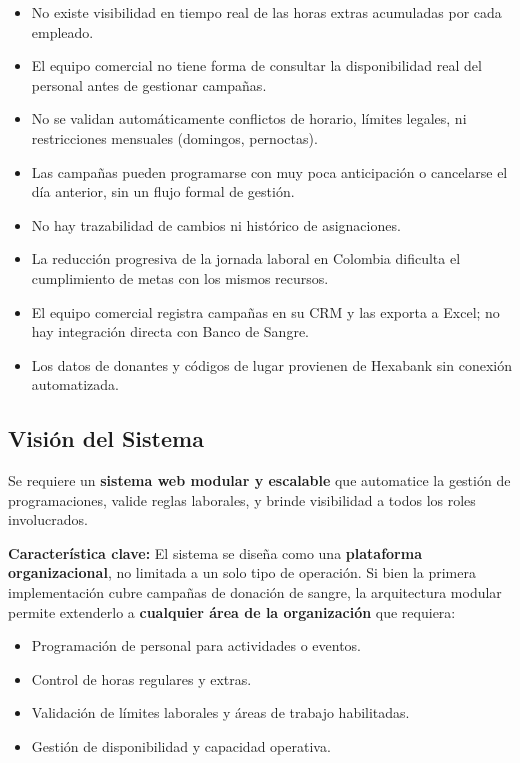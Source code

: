 \documentclass[10pt,a4paper]{article}
\begin{document}
\begin{itemize}[leftmargin=2em]
    \item No existe visibilidad en tiempo real de las horas extras acumuladas por cada empleado.
    \item El equipo comercial no tiene forma de consultar la disponibilidad real del personal antes de gestionar campañas.
    \item No se validan autom\'{a}ticamente conflictos de horario, l\'{i}mites legales, ni restricciones mensuales (domingos, pernoctas).
    \item Las campañas pueden programarse con muy poca anticipaci\'{o}n o cancelarse el d\'{i}a anterior, sin un flujo formal de gesti\'{o}n.
    \item No hay trazabilidad de cambios ni hist\'{o}rico de asignaciones.
    \item La reducci\'{o}n progresiva de la jornada laboral en Colombia dificulta el cumplimiento de metas con los mismos recursos.
    \item El equipo comercial registra campañas en su CRM y las exporta a Excel; no hay integraci\'{o}n directa con Banco de Sangre.
    \item Los datos de donantes y c\'{o}digos de lugar provienen de Hexabank sin conexi\'{o}n automatizada.
\end{itemize}

\subsection{Visi\'{o}n del Sistema}

Se requiere un \textbf{sistema web modular y escalable} que automatice la gesti\'{o}n de programaciones, valide reglas laborales, y brinde visibilidad a todos los roles involucrados.

\textbf{Caracter\'{i}stica clave:} El sistema se diseña como una \textbf{plataforma organizacional}, no limitada a un solo tipo de operaci\'{o}n. Si bien la primera implementaci\'{o}n cubre campañas de donaci\'{o}n de sangre, la arquitectura modular permite extenderlo a \textbf{cualquier \'{a}rea de la organizaci\'{o}n} que requiera:

\begin{itemize}[leftmargin=2em]
    \item Programaci\'{o}n de personal para actividades o eventos.
    \item Control de horas regulares y extras.
    \item Validaci\'{o}n de l\'{i}mites laborales y \'{a}reas de trabajo habilitadas.
    \item Gesti\'{o}n de disponibilidad y capacidad operativa.
\end{itemize}
\end{document}
